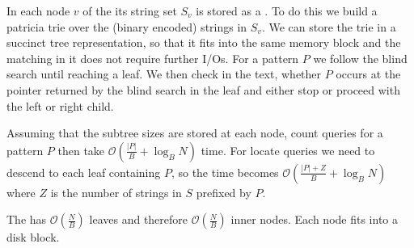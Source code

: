 In each node $v$ of the  its string set $S_v$ is stored as a . To do this we build a patricia trie over the (binary encoded) strings in $S_v$. We can store the trie in a succinct tree representation, so that it fits into the same memory block and the matching in it does not require further I/Os. For a pattern $P$ we follow the blind search until reaching a leaf. We then check in the text, whether $P$ occurs at the pointer returned by the blind search in the leaf and either stop or proceed with the left or right child.

Assuming that the subtree sizes are stored at each node, count queries for a pattern $P$ then take $\mathcal{O}(\frac{\vert P \vert}{B} + \log_B N)$ time. For locate queries we need to descend to each leaf containing $P$, so the time becomes $\mathcal{O}(\frac{\vert P \vert + Z}{B} + \log_B N)$ where $Z$ is the number of strings in $S$ prefixed by $P$.

The  has $\mathcal{O}(\frac{N}{B})$ leaves and therefore $\mathcal{O}(\frac{N}{B})$ inner nodes. Each node fits into a disk block.

